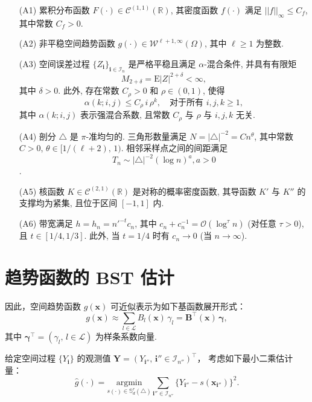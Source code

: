 \documentclass[a4paper,openay,14pt]{ctexbook}
\numberwithin{equation}{section}
\numberwithin{lem}{section}
\begin{document}
\begin{itemize}
\item[(A1)] 累积分布函数 $F(\cdot) \in \mathcal{C}^{(1,1)}(\mathbb{R})$, 其密度函数 $f(\cdot)$ 满足 \( || f ||_{\infty} \leq C_f \), 其中常数 \( C_f > 0 \).

\item[(A2)] 非平稳空间趋势函数 $g(\cdot) \in \mathcal{W}^{\ell+1, \infty}(\Omega)$, 其中 $\ell \geq 1$ 为整数.

\item[(A3)] 空间误差过程 $\{ Z_{\mathbf{i}} \}_{\mathbf{i} \in \mathcal{I}_n}$ 是严格平稳且满足 $\alpha$-混合条件, 并具有有限矩
\[
M_{2+\delta} = \mathrm{E}|Z|^{2+\delta} < \infty,
\]
其中 $\delta > 0$. 此外, 存在常数 $C_\rho > 0$ 和 $\rho \in (0,1)$, 使得
\[
\alpha(k; i, j) \leq C_\rho\, i\, \rho^k, \quad \text{对于所有 } i, j, k \geq 1,
\]
其中 $\alpha(k; i, j)$ 表示强混合系数, 且常数 $C_\rho$ 与 $\rho$ 与 $i, j, k$ 无关.

\item[(A4)] 剖分 $\triangle$ 是 $\pi$-准均匀的. 三角形数量满足 $N = |\triangle|^{-2} = C n^\theta$, 其中常数 $C > 0$, $\theta \in [1/(\ell+2),\,1)$. 相邻采样点之间的间距满足
\[
T_n \sim |\triangle|^{-2} (\log n)^a, a > 0
\].

\item[(A5)] 核函数 $K \in \mathcal{C}^{(2,1)}(\mathbb{R})$ 是对称的概率密度函数, 其导函数 $K'$ 与 $K''$ 的支撑均为紧集, 且位于区间 $[-1,1]$ 内.

\item[(A6)] 带宽满足 $h = h_n = n'^{-t} c_n$, 其中 $c_n + c_n^{-1} = {\scriptstyle{\mathcal{O}}}(\log^\tau n)$ (对任意 $\tau > 0$), 且 $t \in [1/4, 1/3]$. 此外, 当 $t = 1/4$ 时有 $c_n \to 0$ (当 $n \to \infty$).
\end{itemize}

\section{趋势函数的 BST 估计}

因此，空间趋势函数 $g(\boldsymbol{x})$ 可近似表示为如下基函数展开形式：
\[
  g(\boldsymbol{x})
   \approx \sum_{l\in\mathcal{L}} B_l(\boldsymbol{x})\,\gamma_l
  = \mathbf{B}^\top(\boldsymbol{x})\,\boldsymbol{\gamma},
\]
其中 $\boldsymbol{\gamma}^\top=(\gamma_l,\,l\in\mathcal{L})$ 为样条系数向量.

给定空间过程 $\{Y_{\mathbf{i}}\}$ 的观测值
$\mathbf{Y}=(Y_{\mathbf{i}''},\,\mathbf{i}''\in\mathcal{I}_{n''})^\top$，
考虑如下最小二乘估计量：
\begin{equation}\label{EQ:BSTLS}
  \hat{g}(\cdot)
  = \underset{s(\cdot)\in \mathbb{S}_{d}^{r}(\triangle)}{\mathrm{argmin}}
    \sum_{\mathbf{i}''\in\mathcal{I}_{n''}}
    \bigl\{Y_{\mathbf{i}''}-s(\boldsymbol{x}_{\mathbf{i}''})\bigr\}^2.
\end{equation}
\end{document}
